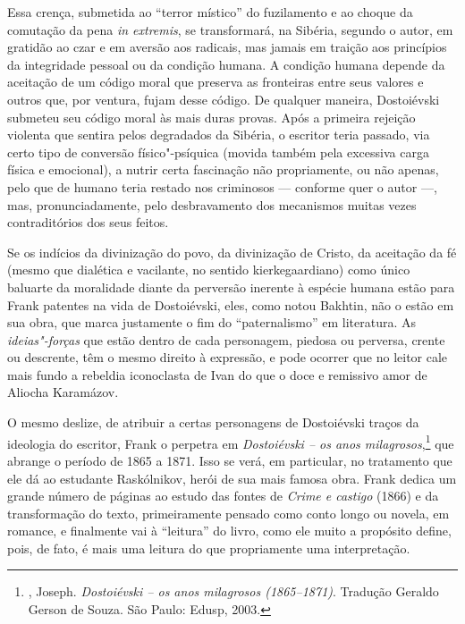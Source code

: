 Essa crença, submetida ao ``terror místico'' do fuzilamento e ao choque
da comutação da pena \emph{in extremis}, se transformará, na Sibéria,
segundo o autor, em gratidão ao czar e em aversão aos radicais, mas
jamais em traição aos princípios da integridade pessoal ou da condição
humana. A condição humana depende da aceitação de um código moral que
preserva as fronteiras entre seus valores e outros que, por ventura,
fujam desse código. De qualquer maneira, Dostoiévski submeteu seu código
moral às mais duras provas. Após a primeira rejeição violenta que
sentira pelos degradados da Sibéria, o escritor teria passado, via certo
tipo de conversão físico"-psíquica (movida também pela excessiva carga
física e emocional), a nutrir certa fascinação não propriamente, ou não
apenas, pelo que de humano teria restado nos criminosos --- conforme quer
o autor ---, mas, pronunciadamente, pelo desbravamento dos mecanismos
muitas vezes contraditórios dos seus feitos.

Se os indícios da divinização do povo, da divinização de Cristo, da
aceitação da fé (mesmo que dialética e vacilante, no sentido
kierkegaardiano) como único baluarte da moralidade diante da perversão
inerente à espécie humana estão para Frank patentes na vida de
Dostoiévski, eles, como notou Bakhtin, não o estão em sua obra, que
marca justamente o fim do ``paternalismo'' em literatura. As
\emph{ideias"-forças} que estão dentro de cada personagem, piedosa
ou perversa, crente ou descrente, têm o mesmo direito à expressão, e
pode ocorrer que no leitor cale mais fundo a rebeldia iconoclasta de
Ivan do que o doce e remissivo amor de Aliocha Karamázov.

O mesmo deslize, de atribuir a certas personagens de Dostoiévski traços
da ideologia do escritor, Frank o perpetra em \emph{Dostoiévski -- os
anos milagrosos},\footnote{, Joseph. \emph{Dostoiévski -- os anos
  milagrosos (1865--1871)}. Tradução Geraldo Gerson de Souza. São Paulo:
  Edusp, 2003.} que abrange o período de 1865 a 1871. Isso se verá, em
particular, no tratamento que ele dá ao estudante Raskólnikov, herói de
sua mais famosa obra. Frank dedica um grande número de páginas ao estudo
das fontes de \emph{Crime e castigo} (1866) e da transformação do texto,
primeiramente pensado como conto longo ou novela, em romance, e
finalmente vai à ``leitura'' do livro, como ele muito a propósito
define, pois, de fato, é mais uma leitura do que propriamente uma
interpretação.

